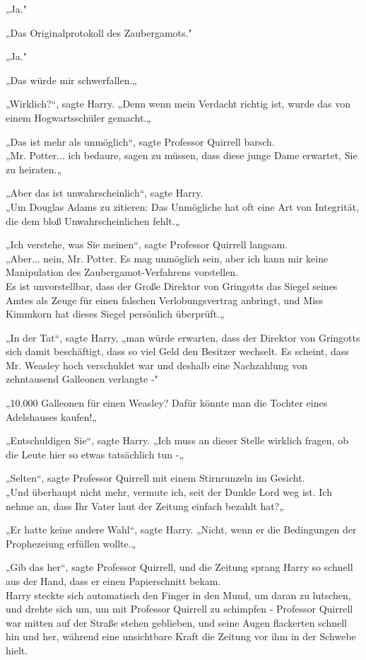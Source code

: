 {„Ja."

„Das Originalprotokoll des Zaubergamots."

„Ja."

„Das würde mir schwerfallen.„

„Wirklich?“, sagte Harry. „Denn wenn mein Verdacht richtig ist, wurde das von einem Hogwartsschüler gemacht.„

„Das ist mehr als unmöglich“, sagte Professor Quirrell barsch.\\ „Mr. Potter... ich bedaure, sagen zu müssen, dass diese junge Dame erwartet, Sie zu heiraten.„

„Aber das ist unwahrscheinlich“, sagte Harry.\\ „Um Douglas Adams zu zitieren: Das Unmögliche hat oft eine Art von Integrität, die dem bloß Unwahrscheinlichen fehlt.„

„Ich verstehe, was Sie meinen“, sagte Professor Quirrell langsam.\\ „Aber... nein, Mr. Potter. Es mag unmöglich sein, aber ich kann mir keine Manipulation des Zaubergamot-Verfahrens vorstellen.\\ Es ist unvorstellbar, dass der Große Direktor von Gringotts das Siegel seines Amtes als Zeuge für einen falschen Verlobungsvertrag anbringt, und Miss Kimmkorn hat dieses Siegel persönlich überprüft.„

„In der Tat“, sagte Harry, „man würde erwarten, dass der Direktor von Gringotts sich damit beschäftigt, dass so viel Geld den Besitzer wechselt. Es scheint, dass Mr. Weasley hoch verschuldet war und deshalb eine Nachzahlung von zehntausend Galleonen verlangte -"

„10.000 Galleonen für einen Weasley? Dafür könnte man die Tochter eines Adelshauses kaufen!„

„Entschuldigen Sie“, sagte Harry. „Ich muss an dieser Stelle wirklich fragen, ob die Leute hier so etwas tatsächlich tun -„

„Selten“, sagte Professor Quirrell mit einem Stirnrunzeln im Gesicht.\\ „Und überhaupt nicht mehr, vermute ich, seit der Dunkle Lord weg ist. Ich nehme an, dass Ihr Vater laut der Zeitung einfach bezahlt hat?„

„Er hatte keine andere Wahl“, sagte Harry. „Nicht, wenn er die Bedingungen der Prophezeiung erfüllen wollte.„

„Gib das her“, sagte Professor Quirrell, und die Zeitung sprang Harry so schnell aus der Hand, dass er einen Papierschnitt bekam.\\ Harry steckte sich automatisch den Finger in den Mund, um daran zu lutschen, und drehte sich um, um mit Professor Quirrell zu schimpfen - Professor Quirrell war mitten auf der Straße stehen geblieben, und seine Augen flackerten schnell hin und her, während eine unsichtbare Kraft die Zeitung vor ihm in der Schwebe hielt.

}

